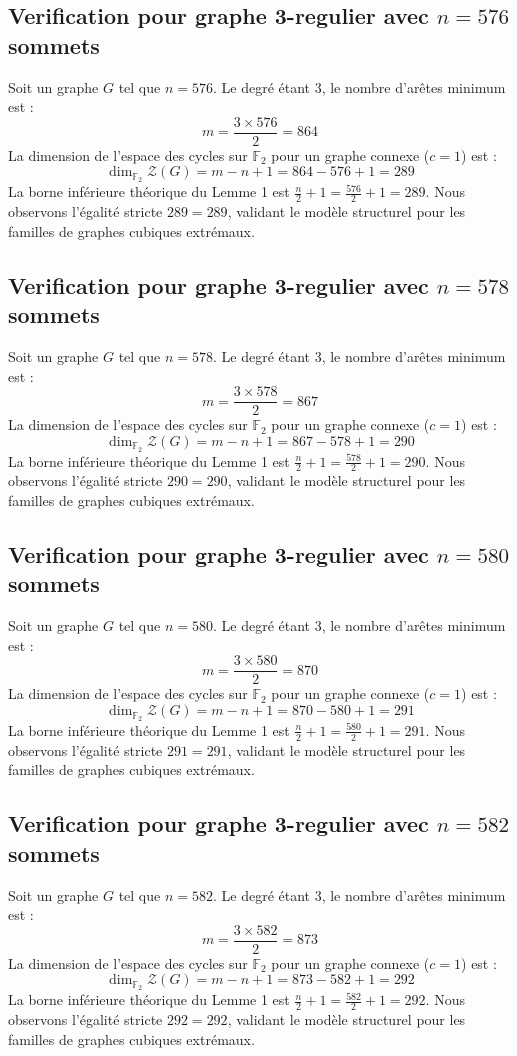 \documentclass[11pt,a4paper]{article}
\begin{document}
\subsection{Verification pour graphe 3-regulier avec $n=576$ sommets}
Soit un graphe $G$ tel que $n = 576$. Le degré étant 3, le nombre d'arêtes minimum est :
$$ m = \frac{3 \times 576}{2} = 864 $$
La dimension de l'espace des cycles sur $\mathbb{F}_2$ pour un graphe connexe ($c=1$) est :
$$ \dim_{\mathbb{F}_2} \mathcal{Z}(G) = m - n + 1 = 864 - 576 + 1 = 289 $$
La borne inférieure théorique du Lemme 1 est $\frac{n}{2} + 1 = \frac{576}{2} + 1 = 289$.
Nous observons l'égalité stricte $289 = 289$, validant le modèle structurel pour les familles de graphes cubiques extrémaux.

\subsection{Verification pour graphe 3-regulier avec $n=578$ sommets}
Soit un graphe $G$ tel que $n = 578$. Le degré étant 3, le nombre d'arêtes minimum est :
$$ m = \frac{3 \times 578}{2} = 867 $$
La dimension de l'espace des cycles sur $\mathbb{F}_2$ pour un graphe connexe ($c=1$) est :
$$ \dim_{\mathbb{F}_2} \mathcal{Z}(G) = m - n + 1 = 867 - 578 + 1 = 290 $$
La borne inférieure théorique du Lemme 1 est $\frac{n}{2} + 1 = \frac{578}{2} + 1 = 290$.
Nous observons l'égalité stricte $290 = 290$, validant le modèle structurel pour les familles de graphes cubiques extrémaux.

\subsection{Verification pour graphe 3-regulier avec $n=580$ sommets}
Soit un graphe $G$ tel que $n = 580$. Le degré étant 3, le nombre d'arêtes minimum est :
$$ m = \frac{3 \times 580}{2} = 870 $$
La dimension de l'espace des cycles sur $\mathbb{F}_2$ pour un graphe connexe ($c=1$) est :
$$ \dim_{\mathbb{F}_2} \mathcal{Z}(G) = m - n + 1 = 870 - 580 + 1 = 291 $$
La borne inférieure théorique du Lemme 1 est $\frac{n}{2} + 1 = \frac{580}{2} + 1 = 291$.
Nous observons l'égalité stricte $291 = 291$, validant le modèle structurel pour les familles de graphes cubiques extrémaux.

\subsection{Verification pour graphe 3-regulier avec $n=582$ sommets}
Soit un graphe $G$ tel que $n = 582$. Le degré étant 3, le nombre d'arêtes minimum est :
$$ m = \frac{3 \times 582}{2} = 873 $$
La dimension de l'espace des cycles sur $\mathbb{F}_2$ pour un graphe connexe ($c=1$) est :
$$ \dim_{\mathbb{F}_2} \mathcal{Z}(G) = m - n + 1 = 873 - 582 + 1 = 292 $$
La borne inférieure théorique du Lemme 1 est $\frac{n}{2} + 1 = \frac{582}{2} + 1 = 292$.
Nous observons l'égalité stricte $292 = 292$, validant le modèle structurel pour les familles de graphes cubiques extrémaux.
\end{document}
